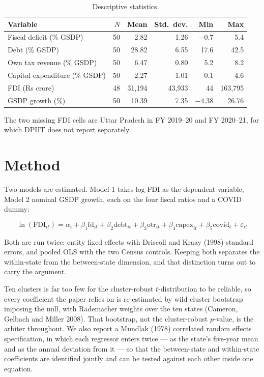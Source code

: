 \documentclass[12pt]{article}
\newcommand{\tnote}[1]{%
  \par\addvspace{4pt}%
  \begin{minipage}{0.92\textwidth}\footnotesize\raggedright #1\end{minipage}}
\begin{document}
\begin{table}[H]
\centering
\caption{Descriptive statistics.}
\label{tab:desc}
\small
\begin{tabular}{@{}lrrrrr@{}}
\toprule
Variable & $N$ & Mean & Std.\ dev. & Min & Max \\
\midrule
Fiscal deficit (\% GSDP)      & 50 & 2.82  & 1.26  & $-0.7$ & 5.4 \\
Debt (\% GSDP)                & 50 & 28.82 & 6.55  & 17.6   & 42.5 \\
Own tax revenue (\% GSDP)     & 50 & 6.47  & 0.80  & 5.2    & 8.2 \\
Capital expenditure (\% GSDP) & 50 & 2.27  & 1.01  & 0.1    & 4.6 \\
FDI (Rs crore)                & 48 & 31{,}194 & 43{,}933 & 44 & 163{,}795 \\
GSDP growth (\%)              & 50 & 10.39 & 7.35  & $-4.38$ & 26.76 \\
\bottomrule
\end{tabular}
\tnote{The two missing FDI cells are Uttar Pradesh in FY 2019--20 and FY
2020--21, for which DPIIT does not report separately.}
\end{table}

\section{Method}

Two models are estimated. Model 1 takes log FDI as the dependent variable, Model
2 nominal GSDP growth, each on the four fiscal ratios and a COVID dummy:

\begin{equation}
\ln(\mathrm{FDI}_{it}) = \alpha_i + \beta_1 \mathrm{fd}_{it} + \beta_2 \mathrm{debt}_{it}
+ \beta_3 \mathrm{otr}_{it} + \beta_4 \mathrm{capex}_{it} + \beta_5 \mathrm{covid}_t + \varepsilon_{it}
\end{equation}

Both are run twice: entity fixed effects with Driscoll and Kraay (1998) standard
errors, and pooled OLS with the two Census controls. Keeping both separates the
within-state from the between-state dimension, and that distinction turns out to
carry the argument.

Ten clusters is far too few for the cluster-robust $t$-distribution to be
reliable, so every coefficient the paper relies on is re-estimated by wild
cluster bootstrap imposing the null, with Rademacher weights over the ten states
(Cameron, Gelbach and Miller 2008). That bootstrap, not the cluster-robust
$p$-value, is the arbiter throughout. We also report a Mundlak (1978) correlated
random effects specification, in which each regressor enters twice --- as the
state's five-year mean and as the annual deviation from it --- so that the
between-state and within-state coefficients are identified jointly and can be
tested against each other inside one equation.
\end{document}
